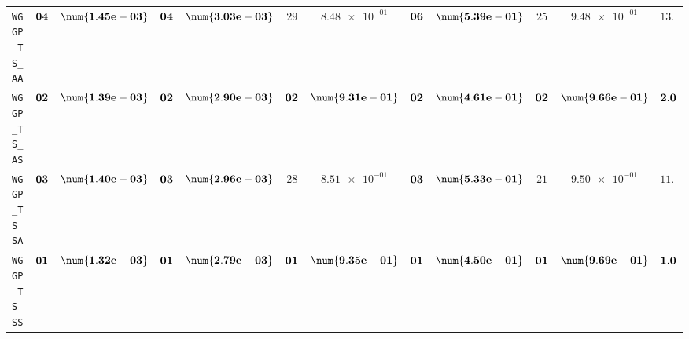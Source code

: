 \begin{xltabular}{\textwidth}{l||cC|cC|cC|cC|cC||c}
	\texttt{WGGP\_TS\_AA} & $\bf 04$ & $\bf \num{1.45e-03}$ & $\bf 04$ & $\bf \num{3.03e-03}$ & $ 29$ & $ \num{8.48e-01}$ & $\bf 06$ & $\bf \num{5.39e-01}$ & $ 25$ & $ \num{9.48e-01}$ & $ 13.6$  \\
	\texttt{WGGP\_TS\_AS} & $\bf 02$ & $\bf \num{1.39e-03}$ & $\bf 02$ & $\bf \num{2.90e-03}$ & $\bf 02$ & $\bf \num{9.31e-01}$ & $\bf 02$ & $\bf \num{4.61e-01}$ & $\bf 02$ & $\bf \num{9.66e-01}$ & $\bf 2.0$  \\
	\texttt{WGGP\_TS\_SA} & $\bf 03$ & $\bf \num{1.40e-03}$ & $\bf 03$ & $\bf \num{2.96e-03}$ & $ 28$ & $ \num{8.51e-01}$ & $\bf 03$ & $\bf \num{5.33e-01}$ & $ 21$ & $ \num{9.50e-01}$ & $ 11.6$  \\
	\texttt{WGGP\_TS\_SS} & $\bf 01$ & $\bf \num{1.32e-03}$ & $\bf 01$ & $\bf \num{2.79e-03}$ & $\bf 01$ & $\bf \num{9.35e-01}$ & $\bf 01$ & $\bf \num{4.50e-01}$ & $\bf 01$ & $\bf \num{9.69e-01}$ & $\bf 1.0$  \\
\end{xltabular}
